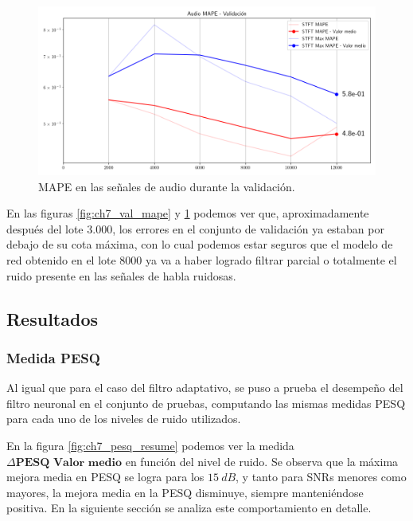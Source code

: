 \begin{figure}
	\centering
	\centerline{\includegraphics[scale=0.65]{images/ch7/entrenamiento/val_audio_mape.png}}
	\caption{MAPE en las señales de audio durante la validación.}
	\label{fig:ch7_val_audio_mape}
\end{figure}

En las figuras \ref{fig:ch7_val_mape} y \ref{fig:ch7_val_audio_mape} podemos ver que, aproximadamente después del lote 3.000, los errores en el conjunto de validación ya estaban por debajo de su cota máxima, con lo cual podemos estar seguros que el modelo de red obtenido en el lote 8000 ya va a haber logrado filtrar parcial o totalmente el ruido presente en las señales de habla ruidosas.

\subsection{Resultados}
\label{sec:resultados_filtro_neuronal}

\subsubsection{Medida PESQ}

Al igual que para el caso del filtro adaptativo, se puso a prueba el desempeño del filtro neuronal en el conjunto de pruebas, computando las mismas medidas PESQ para cada uno de los niveles de ruido utilizados. 

En la figura \ref{fig:ch7_pesq_resume} podemos ver la medida $\Delta \textbf{PESQ Valor medio}$ en función del nivel de ruido. Se observa que la máxima mejora media en PESQ se logra para los $\SI{15}{dB}$, y tanto para SNRs menores como mayores, la mejora media en la PESQ disminuye, siempre manteniéndose positiva. En la siguiente sección se analiza este comportamiento en detalle.

